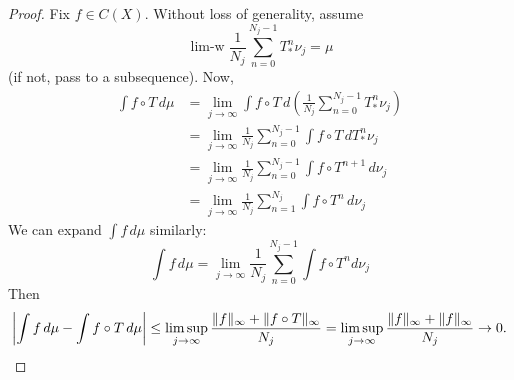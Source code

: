 \documentclass{article}
\DeclareMathOperator*{\limw}{lim-w}
\begin{document}
\begin{proof}
  Fix $f \in C(X)$. Without loss of generality, assume
  \begin{equation*}
    \limw \frac{1}{N_j} \sum_{n=0}^{N_j - 1} T_*^n \nu_j = \mu
  \end{equation*}
  (if not, pass to a subsequence). Now,
  \begin{align*}
    \int f \circ T\,d\mu &= \lim_{j \to \infty} \int f \circ T\,d\!\left(\frac{1}{N_j} \sum_{n=0}^{N_j - 1}T^n_* \nu_j\right) \\
               &= \lim_{j \to \infty} \frac{1}{N_j} \sum_{n=0}^{N_j - 1} \int f \circ T\,d T^n_* \nu_j \\
               &= \lim_{j \to \infty} \frac{1}{N_j} \sum_{n=0}^{N_j - 1} \int f \circ T^{n+1}\,d \nu_j \\
               &= \lim_{j \to \infty} \frac{1}{N_j} \sum_{n=1}^{N_j} \int f \circ T^n\,d \nu_j
  \end{align*}
  We can expand $\int f\,d\mu$ similarly:
  \begin{equation*}
    \int f\,d\mu = \lim_{j \to \infty} \frac{1}{N_j} \sum_{n=0}^{N_j-1} \int f \circ T^n d \nu_j
  \end{equation*}
  Then
  \begin{equation*}
    \left|\int f\,d\mu - \int f \circ T\,d\mu\right| \leq \limsup_{j \to \infty} \frac{\|f\|_\infty + \|f \circ T\|_\infty}{N_j} = \limsup_{j \to \infty} \frac{\|f\|_\infty + \|f\|_\infty}{N_j} \to 0. \qedhere
  \end{equation*}
\end{proof}
\end{document}

